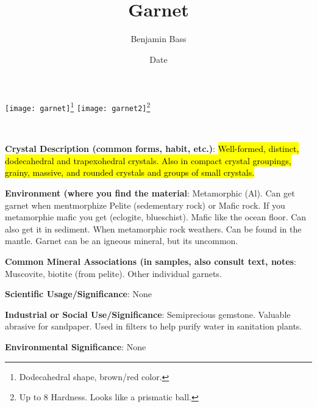 \documentclass[10pt]{article}
\author{Benjamin Bass}
\date{Date}
\title{\vspace{-2.0cm}Garnet} %
\begin{document}
\maketitle


\begin{center}
  \texttt{[image: garnet]}\footnote{Dodecahedral shape, brown/red color.}
  \texttt{[image: garnet2]}\footnote{Up to 8 Hardness. Looks like a prismatic ball.}
\end{center}



\
\
\
\
\
\
\
\
\
\

\begin{framed}
  \textbf{Crystal Description (common forms, habit, etc.)}: \hl{Well-formed, distinct, dodecahedral and trapexohedral crystals. Also in compact crystal groupings, grainy, massive, and rounded crystals and groups of small crystals.}
\end{framed}

\begin{framed}
  \textbf{Environment (where you find the material}: Metamorphic (Al). Can get garnet when mentmorphize Pelite (sedementary rock) or Mafic rock. If you metamorphie mafic you get (eclogite, blueschist). Mafic like the ocean floor.
Can also get it in sediment. When metamorphic rock weathers.
Can be found in the mantle.
Garnet can be an igneous mineral, but its uncommon.
\end{framed}

\begin{framed}
  \textbf{Common Mineral Associations (in samples, also consult text, notes}: Muscovite, biotite (from pelite). Other individual garnets.
\end{framed}

\begin{framed}
  \textbf{Scientific Usage/Significance}: None
\end{framed}

\begin{framed}
  \textbf{Industrial or Social Use/Significance}: Semiprecious gemstone. Valuable abrasive for sandpaper. Used in filters to help purify water in sanitation plants.
\end{framed}

\begin{framed}
  \textbf{Environmental Significance}: None
\end{framed}

\end{document}
